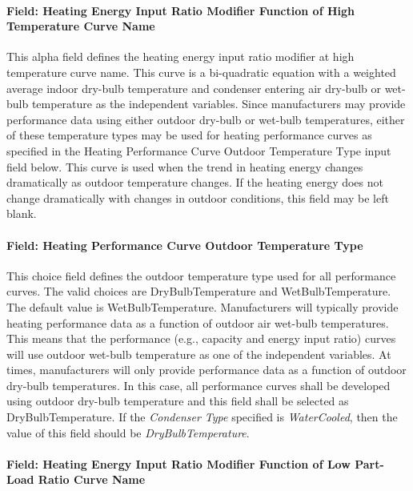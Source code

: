 \paragraph{Field: Heating Energy Input Ratio Modifier Function of High Temperature Curve Name}\label{field-heating-energy-input-ratio-modifier-function-of-high-temperature-curve-name}

This alpha field defines the heating energy input ratio modifier at high temperature curve name. This curve is a bi-quadratic equation with a weighted average indoor dry-bulb temperature and condenser entering air dry-bulb or wet-bulb temperature as the independent variables. Since manufacturers may provide performance data using either outdoor dry-bulb or wet-bulb temperatures, either of these temperature types may be used for heating performance curves as specified in the Heating Performance Curve Outdoor Temperature Type input field below. This curve is used when the trend in heating energy changes dramatically as outdoor temperature changes. If the heating energy does not change dramatically with changes in outdoor conditions, this field may be left blank.

\paragraph{Field: Heating Performance Curve Outdoor Temperature Type}\label{field-heating-performance-curve-outdoor-temperature-type}

This choice field defines the outdoor temperature type used for all performance curves. The valid choices are DryBulbTemperature and WetBulbTemperature. The default value is WetBulbTemperature. Manufacturers will typically provide heating performance data as a function of outdoor air wet-bulb temperatures. This means that the performance (e.g., capacity and energy input ratio) curves will use outdoor wet-bulb temperature as one of the independent variables. At times, manufacturers will only provide performance data as a function of outdoor dry-bulb temperatures. In this case, all performance curves shall be developed using outdoor dry-bulb temperature and this field shall be selected as DryBulbTemperature. If the \textit{Condenser Type} specified is \textit{WaterCooled}, then the value of this field should be \textit{DryBulbTemperature}.

\paragraph{Field: Heating Energy Input Ratio Modifier Function of Low Part-Load Ratio Curve Name}\label{field-heating-energy-input-ratio-modifier-function-of-low-part-load-ratio-curve-name}

